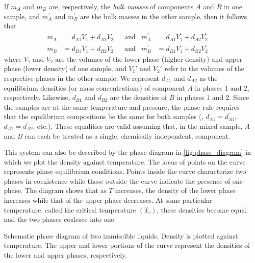 If \(m_A\) and \(m_B\) are, respectively, the \emph{bulk masses} of components \(A\) and \(B\) in one sample, and \(m_A^\prime\) and \(m_B^\prime\) are the bulk masses in the other sample, then it follows that
\begin{align}
	m_A &= d_{A1} V_1 + d_{A2} V_2 && \text{and} & m_A^\prime &= d_{A1} V_1^\prime + d_{A2} V_2^\prime
	\label{eq:two_samples_a}\\
	m_B &= d_{B1} V_1 + d_{B2} V_2 && \text{and} & m_B^\prime &= d_{B1} V_1^\prime + d_{B2} V_2^\prime
	\label{eq:two_samples_b}
\end{align}
where \(V_1\) and \(V_2\) are the volumes of the lower phase (higher density) and upper phase (lower density) of one sample, and \(V_1'\) and \(V_2'\) refer to the volumes of the respective phases in the other sample. 
We represent \(d_{A1}\) and \(d_{A2}\) as the equilibrium densities (or mass concentrations) of component \(A\) in phases 1 and 2, respectively. Likewise, \(d_{B1}\) and \(d_{B2}\) are the densities of \(B\) in phases 1 and 2. 
Since the samples are at the same temperature and pressure, the phase rule requires that the equilibrium compositions be the same for both samples (\ie, \(d_{A1} = d_{A1}^\prime\), \(d_{A2} = d_{A2}^\prime\), etc.). 
These equalities are valid assuming that, in the mixed sample, \(A\) and \(B\) can each be treated as a single, chemically independent, component. 

This system can also be described by the phase diagram in \cref{fig:phase_diagram} in which we plot the density against temperature. 
The locus of points on the curve represents phase equilibrium conditions. 
Points inside the curve characterize two phases in coexistence while  those outside the curve indicate the presence of one phase. 
The diagram shows that as \(T\) increases, the density of the lower phase increases while that of the upper phase decreases. 
At some particular temperature, called the critical temperature \((T_c)\), these densities become equal and the two phases coalesce into one.
\begin{marginfigure}
	\caption{Schematic phase diagram of two immiscible liquids. 
	Density is plotted against temperature. 
	The upper and lower portions of the curve represent the densities of the lower and upper phases, respectively.}
	\label{fig:phase_diagram}
\end{marginfigure}

